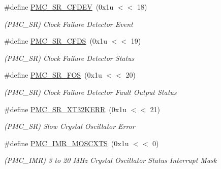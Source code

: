\begin{DoxyCompactItemize}
\mbox{\label{group__SAMS70__PMC_ga3adcbc5d4ac14b059a8fa1bdc190b0b0}} 
\#define \mbox{\hyperlink{group__SAMS70__PMC_ga3adcbc5d4ac14b059a8fa1bdc190b0b0}{P\+M\+C\+\_\+\+S\+R\+\_\+\+C\+F\+D\+EV}}~(0x1u $<$$<$ 18)
\begin{DoxyCompactList}\small\item\em (P\+M\+C\+\_\+\+SR) Clock Failure Detector Event \end{DoxyCompactList}\item 
\mbox{\label{group__SAMS70__PMC_ga76baf0ac10e0387d96168f44b4580dff}} 
\#define \mbox{\hyperlink{group__SAMS70__PMC_ga76baf0ac10e0387d96168f44b4580dff}{P\+M\+C\+\_\+\+S\+R\+\_\+\+C\+F\+DS}}~(0x1u $<$$<$ 19)
\begin{DoxyCompactList}\small\item\em (P\+M\+C\+\_\+\+SR) Clock Failure Detector Status \end{DoxyCompactList}\item 
\mbox{\label{group__SAMS70__PMC_ga643598dc51cd165a73738e4de195df0e}} 
\#define \mbox{\hyperlink{group__SAMS70__PMC_ga643598dc51cd165a73738e4de195df0e}{P\+M\+C\+\_\+\+S\+R\+\_\+\+F\+OS}}~(0x1u $<$$<$ 20)
\begin{DoxyCompactList}\small\item\em (P\+M\+C\+\_\+\+SR) Clock Failure Detector Fault Output Status \end{DoxyCompactList}\item 
\mbox{\label{group__SAMS70__PMC_ga160b82a2230bb8ae6b2a9c821d7f0234}} 
\#define \mbox{\hyperlink{group__SAMS70__PMC_ga160b82a2230bb8ae6b2a9c821d7f0234}{P\+M\+C\+\_\+\+S\+R\+\_\+\+X\+T32\+K\+E\+RR}}~(0x1u $<$$<$ 21)
\begin{DoxyCompactList}\small\item\em (P\+M\+C\+\_\+\+SR) Slow Crystal Oscillator Error \end{DoxyCompactList}\item 
\mbox{\label{group__SAMS70__PMC_gafb541277a0491ee6609499bd2ad386a5}} 
\#define \mbox{\hyperlink{group__SAMS70__PMC_gafb541277a0491ee6609499bd2ad386a5}{P\+M\+C\+\_\+\+I\+M\+R\+\_\+\+M\+O\+S\+C\+X\+TS}}~(0x1u $<$$<$ 0)
\begin{DoxyCompactList}\small\item\em (P\+M\+C\+\_\+\+I\+MR) 3 to 20 M\+Hz Crystal Oscillator Status Interrupt Mask \end{DoxyCompactList}\item 
$$
\end{DoxyCompactItemize}
